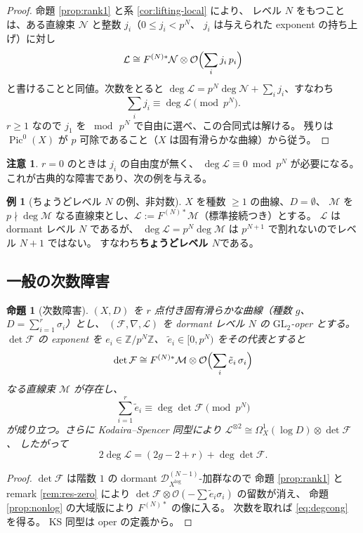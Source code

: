 \documentclass[a4paper,11pt]{ltjsarticle}
\theoremstyle{plain}
\newtheorem{proposition}[theorem]{命題}
\theoremstyle{definition}
\newtheorem{example}[theorem]{例}
\newtheorem{remark}[theorem]{注意}
\newcommand{\bbZ}{\mathbb{Z}}
\newcommand{\cD}{\mathcal{D}}
\newcommand{\cF}{\mathcal{F}}
\newcommand{\cL}{\mathcal{L}}
\newcommand{\cM}{\mathcal{M}}
\newcommand{\cN}{\mathcal{N}}
\newcommand{\cO}{\mathcal{O}}
\newcommand{\Pic}{\operatorname{Pic}}
\newcommand{\Dlog}[1]{\cD^{(#1)}_{X^{\log}}}
\begin{document}
\begin{proof}
命題 \ref{prop:rank1} と系 \ref{cor:lifting-local} により、
レベル $N$ をもつことは、ある直線束 $\cN$ と整数 $j_i$（$0\le j_i<p^N$、
$j_i$ は与えられた exponent の持ち上げ）に対し
\[
  \cL\cong F^{(N)*}\cN\otimes\cO\Bigl(\sum_i j_i\,p_i\Bigr)
\]
と書けることと同値。次数をとると
$\deg\cL=p^N\deg\cN+\sum_i j_i$、すなわち
\[
  \sum_i j_i\equiv\deg\cL \pmod{p^N} .
\]
$r\ge1$ なので $j_1$ を $\bmod\,p^N$ で自由に選べ、この合同式は解ける。
残りは $\Pic^0(X)$ が $p$ 可除であること（$X$ は固有滑らかな曲線）から従う。
\end{proof}

\begin{remark}
$r=0$ のときは $j_i$ の自由度が無く、
$\deg\cL\equiv0\bmod p^N$ が必要になる。
これが古典的な障害であり、次の例を与える。
\end{remark}

\begin{example}[ちょうどレベル $N$ の例、非対数]\label{ex:exactN}
$X$ を種数 $\ge1$ の曲線、$D=\emptyset$、
$\cM$ を $p\nmid\deg\cM$ なる直線束とし、$\cL:=F^{(N)*}\cM$（標準接続つき）とする。
$\cL$ は dormant レベル $N$ であるが、
$\deg\cL=p^N\deg\cM$ は $p^{N+1}$ で割れないのでレベル $N+1$ ではない。
すなわち\textbf{ちょうどレベル $N$}である。
\end{example}

\subsection{一般の次数障害}

\begin{proposition}[次数障害]\label{prop:degree}
$(X,D)$ を $r$ 点付き固有滑らかな曲線（種数 $g$、$D=\sum_{i=1}^r\sigma_i$）とし、
$(\cF,\nabla,\cL)$ を dormant レベル $N$ の $\mathrm{GL}_2$-oper とする。
$\det\cF$ の exponent を $e_i\in\bbZ/p^N\bbZ$、
$\tilde e_i\in[0,p^N)$ をその代表とすると
\[
  \det\cF\cong F^{(N)*}\cM\otimes\cO\Bigl(\sum_i\tilde e_i\,\sigma_i\Bigr)
\]
なる直線束 $\cM$ が存在し、
\begin{equation}\label{eq:degcong}
  \boxed{\ \sum_{i=1}^r\tilde e_i\equiv\deg\det\cF \pmod{p^N}\ }
\end{equation}
が成り立つ。さらに Kodaira--Spencer 同型により
$\cL^{\otimes2}\cong\Omega^1_X(\log D)\otimes\det\cF$、
したがって
\[
  2\deg\cL=(2g-2+r)+\deg\det\cF .
\]
\end{proposition}

\begin{proof}
$\det\cF$ は階数 $1$ の dormant $\Dlog{N-1}$-加群なので
命題 \ref{prop:rank1} と remark \ref{rem:res-zero} により
$\det\cF\otimes\cO(-\sum\tilde e_i\sigma_i)$ の留数が消え、
命題 \ref{prop:nonlog} の大域版により $F^{(N)*}$ の像に入る。
次数を取れば \eqref{eq:degcong} を得る。
KS 同型は oper の定義から。
\end{proof}
\end{document}
